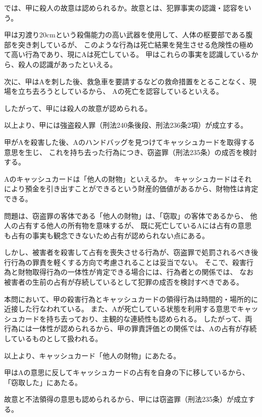 \documentclass[11pt]{jsarticle}
\begin{document}
		\sectionC{}
			では、甲に殺人の故意は認められるか。故意とは、犯罪事実の認識・認容をいう。
			
			甲は刃渡り20cmという殺傷能力の高い武器を使用して、人体の枢要部である腹部を突き刺しているが、
			このような行為は死亡結果を発生させる危険性の極めて高い行為であり、現にAは死亡している。
			甲はこれらの事実を認識しているから、殺人の認識があったといえる。
			
			次に、甲はAを刺した後、救急車を要請するなどの救命措置をとることなく、現場を立ち去ろうとしているから、
			Aの死亡を認容しているといえる。
			
			したがって、甲には殺人の故意が認められる。
			
			以上より、甲には強盗殺人罪（刑法240条後段、刑法236条2項）が成立する。
			
	甲がAを殺害した後、Aのハンドバッグを見つけてキャッシュカードを取得する意思を生じ、
	これを持ち去った行為につき、窃盗罪（刑法235条）の成否を検討する。
	
	\sectionB{}
		Aのキャッシュカードは「他人の財物」といえるか。
		キャッシュカードはそれにより預金を引き出すことができるという財産的価値があるから、財物性は肯定できる。
		
		問題は、窃盗罪の客体である「他人の財物」は、「窃取」の客体であるから、
		他人の占有する他人の所有物を意味するが、
		既に死亡しているAには占有の意思も占有の事実も観念できないため占有が認められない点にある。
		
		しかし、被害者を殺害して占有を喪失させる行為が、窃盗罪で処罰されるべき後行行為の罪責を軽くする方向で考慮されることは妥当でない。
		そこで、殺害行為と財物取得行為の一体性が肯定できる場合には、行為者との関係では、
		なお被害者の生前の占有が存続しているとして犯罪の成否を検討すべきである。
		
		本問において、甲の殺害行為とキャッシュカードの領得行為は時間的・場所的に近接した行なわれている。
		また、Aが死亡している状態を利用する意思でキャッシュカードを持ち去っており、主観的な連続性も認められる。
		したがって、両行為には一体性が認められるから、甲の罪責評価との関係では、Aの占有が存続しているものとして扱われる。
		
		以上より、キャッシュカード「他人の財物」にあたる。
		
	\sectionB{}
		甲はAの意思に反してキャッシュカードの占有を自身の下に移しているから、「窃取した」にあたる。
		
	\sectionB{}
		故意と不法領得の意思も認められるから、甲には窃盗罪（刑法235条）が成立する。
\end{document}
